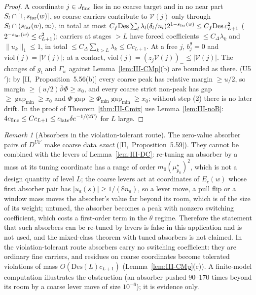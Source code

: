 \documentclass[10pt]{amsart}
\theoremstyle{definition}
\theoremstyle{remark}
\newtheorem{remark}[theorem]{Remark}
\newcommand{\gap}{\operatorname{gap}}
\begin{document}
\begin{proof}
A coordinate $j\in J_{\rm fine}$ lies in no coarse target and in no near part
$S_l\cap[1,s_{\rm far}(w)]$, so coarse carriers contribute to $\mathcal V(j)$ only
through $S_l\cap(s_{\rm far}(w),\infty)$, in total at most
$C_f\mathrm{Des}\sum_l\lambda_l(\delta_l/n_l)2^{1-s_{\rm far}(w)}\le
C_f\mathrm{Des}\,c_{L+1}^2$ ($2^{-s_{\rm far}(w)}\le c_{L+1}^2$); carriers at stages
$>L$ have forced coefficients $\le C_\Delta\lambda_k$ and $\|u_k\|_1\le1$, in total
$\le C_\Delta\sum_{k>L}\lambda_k\le Cc_{L+1}$.  At a free $j$, $b^\theta_j=0$
and $\mathrm{viol}(j)=|\mathcal V(j)|$; at a contact,
$\mathrm{viol}(j)=(z_j\mathcal V(j))_-\le|\mathcal V(j)|$.  The changes of $g_t$ and
$\Gamma_w$ against Lemma~\ref{lem:III-CMp}(b) are bounded as there.  (U5$'$):
by [II,~Proposition~5.56(b)] every coarse peak has relative margin $\ge u/2$, so
margin $\ge(u/2)\bar\vartheta\Phi\ge x_0$, and every coarse strict non-peak has
gap $\ge\gap_{\min}\ge x_0$ and $\Phi\gap\ge\Phi_{\min}\gap_{\min}\ge x_0$;
without step (2) there is no later drift.  In the proof of
Theorem~\ref{thm:III-Cmix} use Lemma~\ref{lem:III-noB}: $4c_{\rm fine}\le
Cc_{L+1}\le c_{\rm late}\delta e^{-1/(2T)}$ for $L$ large.
\end{proof}

\begin{remark}[Absorbers in the violation-tolerant route]\label{rem:III-abs}
The zero-value absorber pairs of $D^{U1'}$ make coarse data \emph{exact}
([II,~Proposition~5.59]).  They cannot be combined with the levers of
Lemma~\ref{lem:III-DC}: re-tuning an absorber by a mass at its tuning coordinate
has a range of order $m_0(\mu^\star_{p_0})^2$, which is not a design quantity of
level $L$; the coarse levers act at coordinates of $E_c(w)$ whose first absorber
pair has $|u_a(s)|\ge1/(8n_a)$, so a lever move, a pull flip or a window mass moves
the absorber's value far beyond its room, which is of the size of its weight;
untuned, the absorber becomes a peak with nonzero switching coefficient, which
costs a first-order term in the $\theta$ regime.  Therefore the statement that such
absorbers can be re-tuned by levers is false in this application and is not used,
and the mixed-class theorem with tuned absorbers is not claimed.  In the
violation-tolerant route absorbers carry no switching coefficient: they are
ordinary fine carriers, and residues on coarse coordinates become tolerated
violations of mass $O(\mathrm{Des}(L)c_{L+1})$
(Lemma~\ref{lem:III-CMp}(c)).  A finite-model computation illustrates the
obstruction (an absorber pushed $90$--$170$ times beyond its room by a coarse
lever move of size $10^{-6}$); it is evidence only.
\end{remark}
\end{document}

